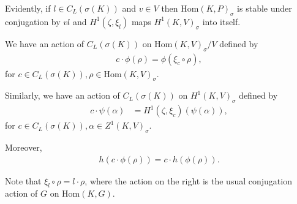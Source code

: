 	Evidently, if $l \in C_L\left(\sigma(K)\right)$ and $v\in V$ then $\mathrm{Hom}(K, P)_\sigma$ is stable under conjugation by $vl$ and $H^1(\zeta, \xi_l)$ maps $H^1(K, V)_{\sigma}$ into itself.

	\begin{lemma}\label{lem:vcl} We have an action of $C_L(\sigma(K))$ on $\mathrm{Hom}(K, V)_\sigma / V$ defined by
		\begin{align} \label{vcl.hom}
			c \cdot \phi(\rho) = \phi\left(\xi_c \circ \rho \right),
		\end{align}
		for $c \in C_L(\sigma(K)), \rho \in \mathrm{Hom}(K, V)_\sigma$.
		
		Similarly, we have an action of $C_L(\sigma(K))$ on $H^1(K, V)_\sigma$ defined by
		\begin{align} \label{cl.h1}
			c \cdot \psi(\alpha)
			&= H^1(\zeta, \xi_c)\left(\psi(\alpha)\right), 
		\end{align}
		for $c \in C_L(\sigma(K)), \alpha \in Z^1(K, V)_\sigma$.

	Moreover,
	\begin{align}\label{eqn:caction}
		h(c\cdot\phi(\rho)) = c \cdot h(\phi(\rho)).
	\end{align}
	\end{lemma}
\begin{remark}
 Note that $\xi_l \circ \rho = l \cdot \rho$, where the action on the right is the usual conjugation action of $G$ on $\mathrm{Hom}(K, G)$.
\end{remark}
